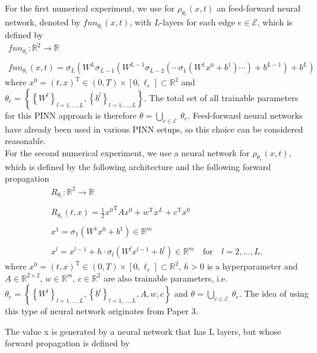 For the first numerical experiment, we use for $\rho_{\theta_e}(x, t)$ an feed-forward neural network, denoted by $fnn_{\theta_e}(x, t)$, with $L$-layers for each edge $e \in \mathcal{E}$, which is defined by 
\begin{gather}
    \label{one_for_each}
    fnn_{\theta_e} \colon \mathbb{R}^2 \to \mathbb{R} \\
    \\
    fnn_{\theta_e}(x, t) = \sigma_L(W^L \sigma_{L-1}(W^{L-1}\sigma_{L-2}(\cdots \sigma_{1}(W^{1}x^0 +b^1) \cdots) + b^{L-1}) + b^{L}) 
\end{gather}
where $x^0 = (t, x)^{\mathrm{T}} \in (0, T) \times [0, \ell_e] \subset \mathbb{R}^2$ and $\theta_e = \left\{ \left\{ W^l \right\}_{l = 1, \ldots, L}, \left\{ b^l \right\}_{l = 1, \ldots, L} \right\}$. The total set of all trainable parameters for this PINN approach is therefore $\theta = \bigcup_{e \in \mathcal{E}} \ \theta_e$. Feed-forward neural networks have already been used in various PINN setups, so this choice can be considered reasonable.  \\
For the second numerical experiment, we use a neural network for $\rho_{\theta_e}(x, t)$, which is defined by the following architecture and the following forward propagation
\begin{gather}
    \label{Resnet}
    R_{\theta_e} \colon \mathbb{R}^2 \to \mathbb{R} \\
    \\
    R_{\theta_e}(t,x) = \frac{1}{2} {x^0}^{\mathrm{T}} A x^0 + w^{\mathrm{T}} x^{L} + c^{\mathrm{T}} x^0 \\
    \\
    x^1 = \sigma_1(W^1 x^{0} + b^1) \in \mathbb{R}^m \\
    \\
    x^l = x^{l-1} + h \cdot \sigma_l(W^l x^{l-1} + b^l) \in \mathbb{R}^m \quad \text{for} \quad l = 2, \ldots, L, 
\end{gather}
where $x^0 = (t, x)^{\mathrm{T}} \in (0, T) \times [0, \ell_e] \subset \mathbb{R}^2$, $h > 0$ is a hyperparameter and $A \in \mathbb{R}^{2 \times 2}$, $w \in \mathbb{R}^m$, $c \in \mathbb{R}^2$ are also trainable parameters, i.e. $\theta_e = \left\{ \left\{ W^l \right\}_{l = 1, \ldots, L}, \left\{ b^l \right\}_{l = 1, \ldots, L}, A, w, c \right\}$ and $\theta = \bigcup_{e \in \mathcal{E}} \ \theta_e$. The idea of using this type of neural network originates from Paper 3. 

The value x is generated by a neural network that has L layers, but whose forward propagation is defined by 






